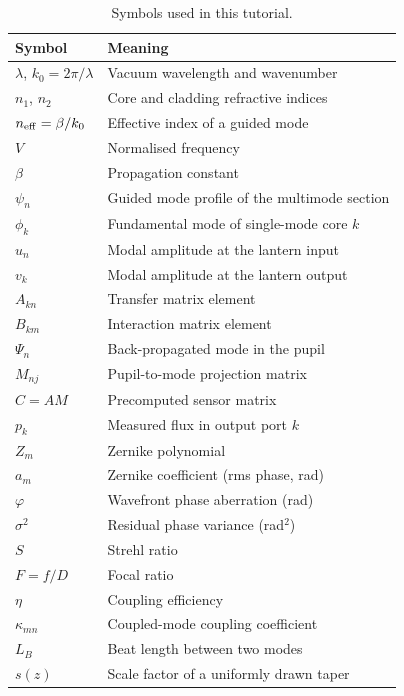 \documentclass[11pt,a4paper]{article}
\begin{document}
\begin{table}[h]
\centering
\caption{Symbols used in this tutorial.}
\label{tab:symbols}
\begin{tabular}{@{}ll@{}}
\toprule
\textbf{Symbol} & \textbf{Meaning} \\
\midrule
$\lambda$, $k_0 = 2\pi/\lambda$ & Vacuum wavelength and wavenumber \\
$n_1$, $n_2$ & Core and cladding refractive indices \\
$n_{\rm eff} = \beta/k_0$ & Effective index of a guided mode \\
$V$ & Normalised frequency \\
$\beta$ & Propagation constant \\
$\psi_n$ & Guided mode profile of the multimode section \\
$\phi_k$ & Fundamental mode of single-mode core $k$ \\
$u_n$ & Modal amplitude at the lantern input \\
$v_k$ & Modal amplitude at the lantern output \\
$A_{kn}$ & Transfer matrix element \\
$B_{km}$ & Interaction matrix element \\
$\Psi_n$ & Back-propagated mode in the pupil \\
$M_{nj}$ & Pupil-to-mode projection matrix \\
$C = AM$ & Precomputed sensor matrix \\
$p_k$ & Measured flux in output port $k$ \\
$Z_m$ & Zernike polynomial \\
$a_m$ & Zernike coefficient (rms phase, rad) \\
$\varphi$ & Wavefront phase aberration (rad) \\
$\sigma^2$ & Residual phase variance (rad$^2$) \\
$S$ & Strehl ratio \\
$F = f/D$ & Focal ratio \\
$\eta$ & Coupling efficiency \\
$\kappa_{mn}$ & Coupled-mode coupling coefficient \\
$L_B$ & Beat length between two modes \\
$s(z)$ & Scale factor of a uniformly drawn taper \\
\bottomrule
\end{tabular}
\end{table}
\end{document}
